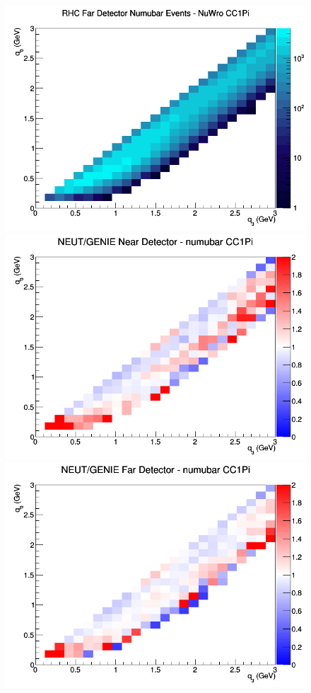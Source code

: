 \begin{figure}[h]
\endminipage
{}
\includegraphics[width=\linewidth]{q0_q3/nominal/CC1Pi_RHC_FD_numubar_q3_q0_NuWro.png}
\endminipage
\newline
{}
\includegraphics[width=\linewidth]{q0_q3/nominal/ratios/CC1Pi_NEUT_GENIE_numubar_near_q3_q0.png}
\endminipage
{}
\includegraphics[width=\linewidth]{q0_q3/nominal/ratios/CC1Pi_NEUT_GENIE_numubar_far_q3_q0.png}

\end{figure}
